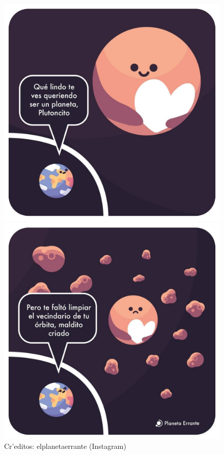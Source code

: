 \documentclass{article}
\begin{document}
\begin{figure}[!h]
  \centering
  \begin{minipage}[b]{0.4\textwidth}
    \includegraphics[width=\textwidth]{Pluton_1.jpg}
  \end{minipage}
  \begin{minipage}[b]{0.4\textwidth}
    \includegraphics[width=\textwidth]{Pluton_2.jpg}
  \end{minipage}
  \captionsetup{justification=raggedleft,
singlelinecheck=false
}
\caption*{{\footnotesize Cr'editos: elplanetaerrante (Instagram)} }
\end{figure}
\end{document}
